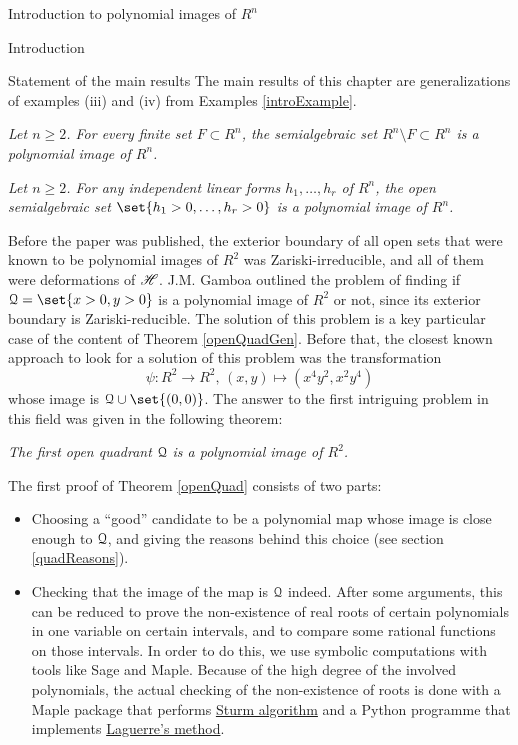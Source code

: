 \documentclass[11pt, a4paper, english, twoside, notitlepage, openright]{report}
\begin{document}
\begin{chapter}{Introduction to polynomial images of $R^n$}
\begin{section}{Introduction}
\begin{subsection}{Statement of the main results}
The main results of this chapter are generalizations of examples (iii) and (iv) from Examples \ref{introExample}.
\begin{theorem}\label{finSetTh}\em Let $n\ge2$. For every finite set $F\subset R^n$, the semialgebraic set $R^n\setminus F\subset R^n$ is a polynomial image of $R^n$.\em
\end{theorem}
\begin{theorem}\label{openQuadGen}\em Let $n\ge 2$. For any independent linear forms $h_1,\dots,h_r$ of $R^n$, the open semialgebraic set $\set{h_1>0,\dots,h_r>0}$ is a polynomial image of $R^n$.\em
\end{theorem}
	
Before the paper \cite{fg} was published, the exterior boundary of all open sets that were known to be polynomial images of $R^2$ was Zariski-irreducible, and all of them were deformations of $\mathscr{H}$. J.M. Gamboa outlined the problem of finding if $\Qu=\set{x>0,y>0}$ is a polynomial image of $R^2$ or not, since its exterior boundary is Zariski-reducible. The solution of this problem is a key particular case of the content of Theorem \ref{openQuadGen}. Before that, the closest known approach to look for a solution of this problem was the transformation
$$
\psi:R^2 \to R^2,\, (x,y)\mapsto(x^4y^2,x^2y^4)
$$	
whose image is $\Qu\cup\set{(0,0)}$. The answer to the first intriguing problem in this field was given in the following theorem:
\begin{theorem}\label{openQuad}\em The first open quadrant $\mathcal{Q}$ is a polynomial image of $R^2$.\em
\end{theorem}
	
\begin{remark} The first proof of Theorem \ref{openQuad} consists of two parts:
\begin{itemize}
\item Choosing a ``good'' candidate to be a polynomial map whose image is close enough to $\mathcal{Q}$, and giving the reasons behind this choice (see section \ref{quadReasons}). 
	
\item Checking that the image of the map is $\mathcal{Q}$ indeed. After some arguments, this can be reduced to prove the non-existence of real roots of certain polynomials in one variable on certain intervals, and to compare some rational functions on those intervals. In order to do this, we use symbolic computations with tools like Sage and Maple. Because of the high degree of the involved polynomials, the actual checking of the non-existence of roots is done with a Maple package that performs \hyperref[sturm]{Sturm algorithm} and a Python programme that implements \hyperref[laguerre]{Laguerre's method}.
\end{itemize}
\end{remark}


\end{subsection}
\end{section}
\end{chapter}
\end{document}
